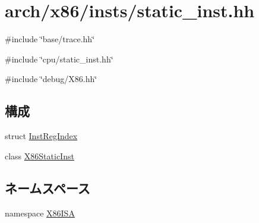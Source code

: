 \hypertarget{arch_2x86_2insts_2static__inst_8hh}{
\section{arch/x86/insts/static\_\-inst.hh}
\label{arch_2x86_2insts_2static__inst_8hh}
}
{\ttfamily \#include \char`\"{}base/trace.hh\char`\"{}}\par
{\ttfamily \#include \char`\"{}cpu/static\_\-inst.hh\char`\"{}}\par
{\ttfamily \#include \char`\"{}debug/X86.hh\char`\"{}}\par
\subsection*{構成}
\begin{DoxyCompactItemize}
\item 
struct \hyperlink{structX86ISA_1_1InstRegIndex}{InstRegIndex}
\item 
class \hyperlink{classX86ISA_1_1X86StaticInst}{X86StaticInst}
\end{DoxyCompactItemize}
\subsection*{ネームスペース}
\begin{DoxyCompactItemize}
\item 
namespace \hyperlink{namespaceX86ISA}{X86ISA}
\end{DoxyCompactItemize}
